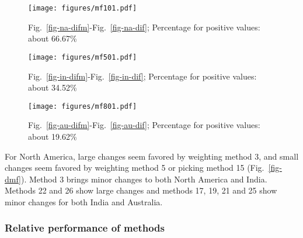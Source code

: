 \begin{figure*}
	\centering
	\begin{subfigure}{1.01\textwidth}
		\texttt{[image: figures/mf101.pdf]}
		\caption{Fig.~\ref{fig-na-difm}-Fig.~\ref{fig-na-dif}; Percentage for
		positive values: about 66.67\%}\label{fig-mf101}
	\end{subfigure}
	\vspace{.1em}
	\begin{subfigure}{1.01\textwidth}
		\texttt{[image: figures/mf501.pdf]}
		\caption{Fig.~\ref{fig-in-difm}-Fig.~\ref{fig-in-dif}; Percentage for
		positive values: about 34.52\%}\label{fig-mf501}
	\end{subfigure}
	\vspace{.1em}
	\begin{subfigure}{1.01\textwidth}
		\texttt{[image: figures/mf801.pdf]}
		\caption{Fig.~\ref{fig-au-difm}-Fig.~\ref{fig-au-dif}; Percentage for
		positive values: about 19.62\%}\label{fig-mf801}
	\end{subfigure}
	\caption[Differences between results from FHM and MHM]{Differences between
results from two different reference paths, FHM (Fig.~\ref{fig-dif}) and MHM
(Fig.~\ref{fig-difm}) derived. The absolute difference values less than
1.96-standard-deviation interval of the whole 168 values are labeled in green,
more than 1.96-standard-deviation interval labeled in red.}\label{fig-dmf}
\end{figure*}

For North America, large changes seem favored by weighting method 3, and small
changes seem favored by weighting method 5 or picking method 15
(Fig.~\ref{fig-dmf}). Method 3 brings minor changes to both North America and
India. Methods 22 and 26 show large changes and methods 17, 19, 21 and 25 show
minor changes for both India and Australia.

\subsubsection{Relative performance of methods}

